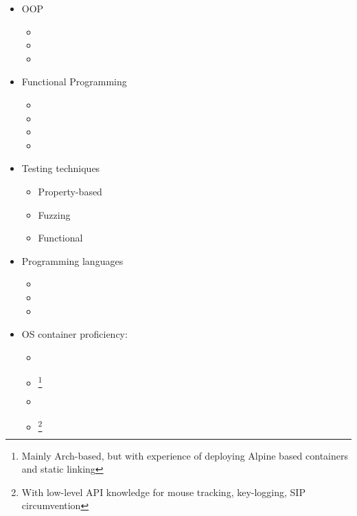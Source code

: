 \documentclass{CurriculumVitae}[10pt, condensed]
\begin{document}
\begin{multicols}{4}
\begin{itemize}[topsep=0pt]
    \item {\footnotesize OOP}
      \begin{itemize}[topsep=0pt, partopsep=0pt]
        \setlength{\itemsep}{-0.3em}
      \item {}
      \item {}
      \item {}
      \end{itemize}
      
    \item {\footnotesize Functional Programming}
      \begin{itemize}[topsep=0pt, partopsep=0pt]
        \setlength{\itemsep}{-0.3em}
      \item {}
      \item {}
      \item {}
      \item {}
      \end{itemize}
      
    \item {\footnotesize Testing techniques}
      \begin{itemize}[topsep=0pt, partopsep=0pt]
        \setlength{\itemsep}{-0.3em}
      \item {\footnotesize Property-based}
      \item {\footnotesize Fuzzing}
      \item {\footnotesize Functional}
      \end{itemize}
      
    \item {\footnotesize Programming languages}
      \begin{itemize}[topsep=0pt, partopsep=0pt]
        \setlength{\itemsep}{-0.3em}
      \item {}
      \item {}
      \item {}
      \end{itemize}
      
    \item {\footnotesize OS container proficiency:}
      \begin{itemize}[topsep=0pt, partopsep=0pt]
        \setlength{\itemsep}{-0.3em}
        
      \item {}
      \item {}\footnote{Mainly Arch-based, but with experience
          of deploying Alpine based containers and static linking}
      \item {}
      \item {}\footnote{With low-level API knowledge for
          mouse tracking, key-logging, SIP circumvention}
      \end{itemize}
      

\end{itemize}
\end{multicols}
\end{document}
